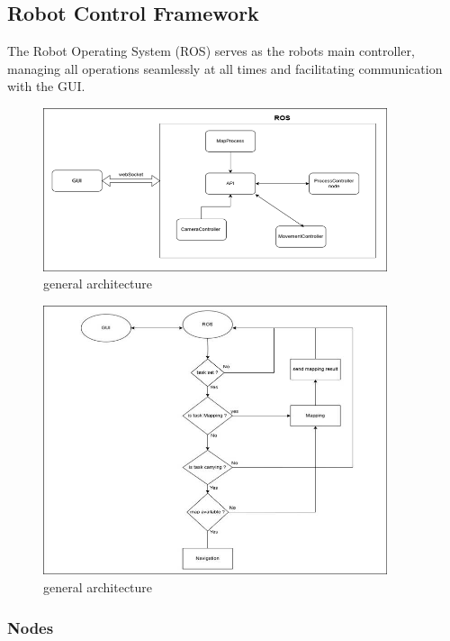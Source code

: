 \documentclass[../../main]{subfiles}
\begin{document}
\subsection{Robot Control Framework}
The Robot Operating System (ROS) serves as the robot\textquotesingle s
main controller, managing all operations seamlessly at all times and
facilitating communication with the GUI.

\begin{figure}[h!]
\centering
\includegraphics[width=0.9\textwidth]{img/image022.png}
\caption{general architecture}
\label{judFig15}
\end{figure}

\begin{figure}[h!]
\centering
\includegraphics[width=0.9\textwidth]{img/image024.jpg}
\caption{general architecture}
\end{figure}

\subsubsection{Nodes}
\end{document}

